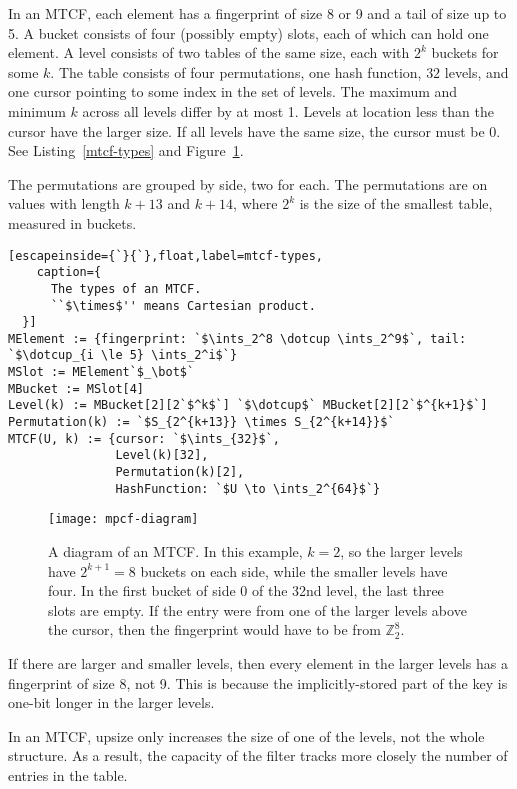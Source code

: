 \documentclass[sigconf, nonacm]{acmart}
\newcommand{\ints}{\mathbb{Z}}
\newcommand{\dotcup}{\ensuremath{\mathaccent\cdot\cup}}
\begin{document}
In an MTCF, each element has a fingerprint of size 8 or 9 and a tail of size up to 5.
A bucket consists of four (possibly empty) slots, each of which can hold one element.
A level consists of two tables of the same size, each with $2^k$ buckets for some $k$.
The table consists of four permutations, one hash function, $32$ levels, and one cursor pointing to some index in the set of levels.
The maximum and minimum $k$ across all levels differ by at most 1.
Levels at location less than the cursor have the larger size.
If all levels have the same size, the cursor must be 0.
See Listing~\ref{mtcf-types} and Figure~\ref{mtcf-diagram}.

The permutations are grouped by side, two for each.
The permutations are on values with length $k + 13$ and $k + 14$, where $2^k$ is the size of the smallest table, measured in buckets.

\begin{lstlisting}[escapeinside={`}{`},float,label=mtcf-types,
    caption={
      The types of an MTCF.
      ``$\times$'' means Cartesian product.
  }]
MElement := {fingerprint: `$\ints_2^8 \dotcup \ints_2^9$`, tail: `$\dotcup_{i \le 5} \ints_2^i$`}
MSlot := MElement`$_\bot$`
MBucket := MSlot[4]
Level(k) := MBucket[2][2`$^k$`] `$\dotcup$` MBucket[2][2`$^{k+1}$`]
Permutation(k) := `$S_{2^{k+13}} \times S_{2^{k+14}}$`
MTCF(U, k) := {cursor: `$\ints_{32}$`,
               Level(k)[32],
               Permutation(k)[2],
               HashFunction: `$U \to \ints_2^{64}$`}

\end{lstlisting}

\begin{figure}
  \texttt{[image: mpcf-diagram]}
\caption{\label{mtcf-diagram}
A diagram of an MTCF.
In this example, $k = 2$, so the larger levels have $2^{k+1} = 8$ buckets on each side, while the smaller levels have four.
In the first bucket of side 0 of the 32nd level, the last three slots are empty.
If the entry were from one of the larger levels above the cursor, then the fingerprint would have to be from $\ints_2^8$.
}

\end{figure}

If there are larger and smaller levels, then every element in the larger levels has a fingerprint of size 8, not 9.
This is because the implicitly-stored part of the key is one-bit longer in the larger levels.

In an MTCF, upsize only increases the size of one of the levels, not the whole structure.
As a result, the capacity of the filter tracks more closely the number of entries in the table.
\end{document}
